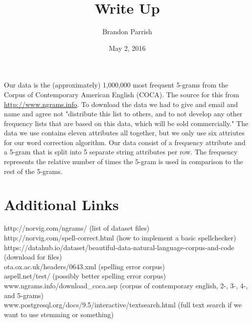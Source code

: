 \documentclass{article}
\title{Write Up}
\author{Brandon Parrish}
\date{May 2, 2016}
\begin{document}
	\maketitle

	Our data is the (approximately) 1,000,000 most frequent 5-grams from the Corpus of Contemporary American English (COCA). The source for this from \url{http://www.ngrams.info}. To download the data we had to give and email and name and agree not "distribute this list to others, and to not develop any other frequency lists that are based on this data, which will be sold commercially." 
\vspace{5mm}
	The data we use contains eleven attributes all together, but we only use six attriutes for our word correction algorithm. Our data consist of a frequency attribute and a 5-gram that is split into 5 separate string attributes per row. The frequency represents the relative number of times the 5-gram is used in comparison to the rest of the 5-grams. 

\newpage 
\section{Additional Links}

http://norvig.com/ngrams/ (list of dataset files) \\

http://norvig.com/spell-correct.html (how to implement a basic spellchecker) \\

https://datahub.io/dataset/beautiful-data-natural-language-corpus-and-code (download for files) \\

ota.ox.ac.uk/headers/0643.xml (spelling error corpus) \\

aspell.net/test/ (possibly better spelling error corpus) \\

www.ngrams.info/download\_coca.asp (corpus of contemporary english, 2-, 3-, 4-, and 5-grams) \\

www.postgresql.org/docs/9.5/interactive/textsearch.html (full text search if we want to use stemming or something) \\
\end{document}
